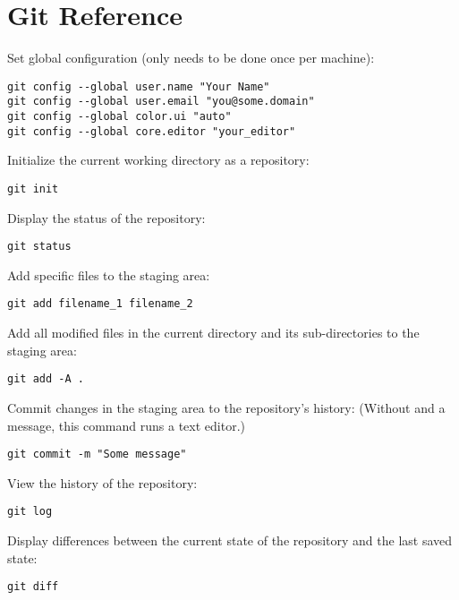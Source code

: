 \section{Git Reference}

Set global configuration (only needs to be done once per machine):

\begin{Verbatim}
git config --global user.name "Your Name"
git config --global user.email "you@some.domain"
git config --global color.ui "auto"
git config --global core.editor "your_editor"
\end{Verbatim}

Initialize the current working directory as a repository:

\begin{Verbatim}
git init
\end{Verbatim}

Display the status of the repository:

\begin{Verbatim}
git status
\end{Verbatim}

Add specific files to the staging area:

\begin{Verbatim}
git add filename_1 filename_2
\end{Verbatim}

Add all modified files in the current directory and its sub-directories
to the staging area:

\begin{Verbatim}
git add -A .
\end{Verbatim}

Commit changes in the staging area to the repository's history: (Without
 and a message, this command runs a text editor.)

\begin{Verbatim}
git commit -m "Some message"
\end{Verbatim}

View the history of the repository:

\begin{Verbatim}
git log
\end{Verbatim}

Display differences between the current state of the repository and the
last saved state:

\begin{Verbatim}
git diff
\end{Verbatim}

